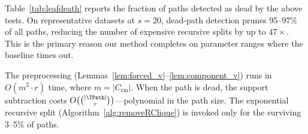 

Table~\ref{tab:leafdeath} reports the fraction of paths detected as dead by the above tests.
On representative datasets at $s = 20$, dead-path detection prunes 95--97\% of all paths,
reducing the number of expensive recursive splits by up to $47\times$.
This is the primary reason our method completes on parameter ranges where the baseline times out.

The preprocessing (Lemmas~\ref{lem:forced_v}--\ref{lem:component_v}) runs in $O(m^2 \cdot r)$ time, where $m = |C_{\mathrm{rm}}|$.
When the path is dead, the support subtraction costs $O\bigl(\binom{|\TPath|}{r}\bigr)$---polynomial in the path size.
The exponential recursive split (Algorithm~\ref{alg:removeRClique}) is invoked only for the surviving 3--5\% of paths.
